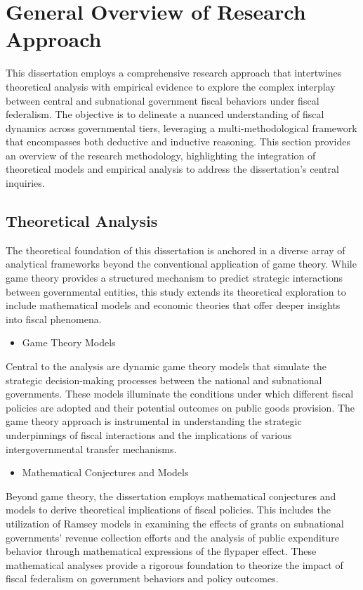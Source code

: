 \section{General Overview of Research Approach}

This dissertation employs a comprehensive research approach that intertwines theoretical analysis with empirical evidence to explore the complex interplay between central and subnational government fiscal behaviors under fiscal federalism. The objective is to delineate a nuanced understanding of fiscal dynamics across governmental tiers, leveraging a multi-methodological framework that encompasses both deductive and inductive reasoning. This section provides an overview of the research methodology, highlighting the integration of theoretical models and empirical analysis to address the dissertation's central inquiries.

\subsection{Theoretical Analysis}
The theoretical foundation of this dissertation is anchored in a diverse array of analytical frameworks beyond the conventional application of game theory. While game theory provides a structured mechanism to predict strategic interactions between governmental entities, this study extends its theoretical exploration to include mathematical models and economic theories that offer deeper insights into fiscal phenomena.
\begin{itemize}
    \item Game Theory Models
\end{itemize}

Central to the analysis are dynamic game theory models that simulate the strategic decision-making processes between the national and subnational governments. These models illuminate the conditions under which different fiscal policies are adopted and their potential outcomes on public goods provision. The game theory approach is instrumental in understanding the strategic underpinnings of fiscal interactions and the implications of various intergovernmental transfer mechanisms.

\begin{itemize}
    \item Mathematical Conjectures and Models
\end{itemize}

Beyond game theory, the dissertation employs mathematical conjectures and models to derive theoretical implications of fiscal policies. This includes the utilization of Ramsey models in examining the effects of grants on subnational governments' revenue collection efforts and the analysis of public expenditure behavior through mathematical expressions of the flypaper effect. These mathematical analyses provide a rigorous foundation to theorize the impact of fiscal federalism on government behaviors and policy outcomes.

